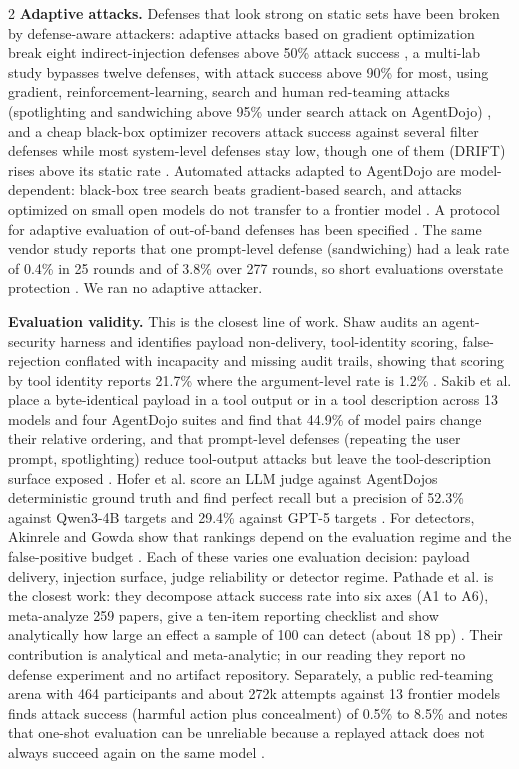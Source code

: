 \documentclass[9pt]{extarticle}
\begin{document}
\begin{multicols}{2}
\textbf{Adaptive attacks.} Defenses that look strong on static sets have been broken by defense-aware attackers: adaptive attacks based on gradient optimization break eight indirect-injection defenses above 50\% attack success \cite{arxiv2503_00061}, a multi-lab study bypasses twelve defenses, with attack success above 90\% for most, using gradient, reinforcement-learning, search and human red-teaming attacks (spotlighting and sandwiching above 95\% under search attack on AgentDojo) \cite{arxiv2510_09023}, and a cheap black-box optimizer recovers attack success against several filter defenses while most system-level defenses stay low, though one of them (DRIFT) rises above its static rate \cite{arxiv2606_15057}. Automated attacks adapted to AgentDojo are model-dependent: black-box tree search beats gradient-based search, and attacks optimized on small open models do not transfer to a frontier model \cite{arxiv2606_10525}. A protocol for adaptive evaluation of out-of-band defenses has been specified \cite{arxiv2606_26479}. The same vendor study reports that one prompt-level defense (sandwiching) had a leak rate of 0.4\% in 25 rounds and of 3.8\% over 277 rounds, so short evaluations overstate protection \cite{arxiv2604_23887}. We ran no adaptive attacker.

\textbf{Evaluation validity.} This is the closest line of work. Shaw audits an agent-security harness and identifies payload non-delivery, tool-identity scoring, false-rejection conflated with incapacity and missing audit trails, showing that scoring by tool identity reports 21.7\% where the argument-level rate is 1.2\% \cite{arxiv2609_32691}. Sakib et al. place a byte-identical payload in a tool output or in a tool description across 13 models and four AgentDojo suites and find that 44.9\% of model pairs change their relative ordering, and that prompt-level defenses (repeating the user prompt, spotlighting) reduce tool-output attacks but leave the tool-description surface exposed \cite{arxiv2605_30454}. Hofer et al. score an LLM judge against AgentDojo\textquotesingle s deterministic ground truth and find perfect recall but a precision of 52.3\% against Qwen3-4B targets and 29.4\% against GPT-5 targets \cite{arxiv2606_10525}. For detectors, Akinrele and Gowda show that rankings depend on the evaluation regime and the false-positive budget \cite{arxiv2605_26999}. Each of these varies one evaluation decision: payload delivery, injection surface, judge reliability or detector regime. Pathade et al. is the closest work: they decompose attack success rate into six axes (A1 to A6), meta-analyze 259 papers, give a ten-item reporting checklist and show analytically how large an effect a sample of 100 can detect (about 18 pp) \cite{arxiv2609_25173}. Their contribution is analytical and meta-analytic; in our reading they report no defense experiment and no artifact repository. Separately, a public red-teaming arena with 464 participants and about 272k attempts against 13 frontier models finds attack success (harmful action plus concealment) of 0.5\% to 8.5\% and notes that one-shot evaluation can be unreliable because a replayed attack does not always succeed again on the same model \cite{arxiv2603_15714}.


\end{multicols}
\end{document}
